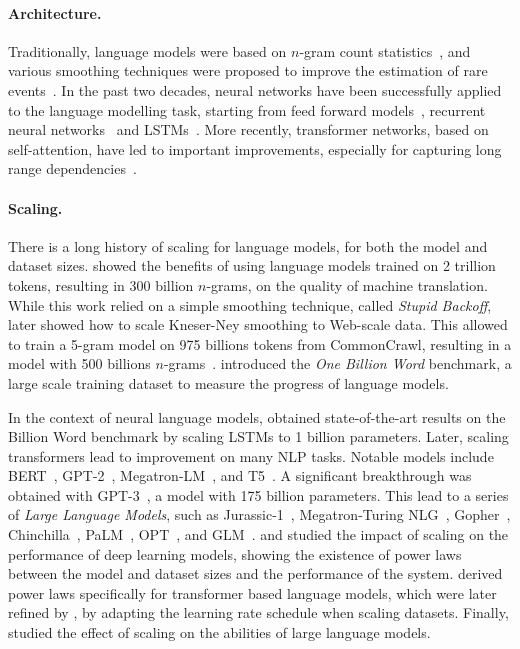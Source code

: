 \paragraph{Architecture.} Traditionally, language models were based on $n$-gram count statistics~\citep{bahl1983maximum}, and various smoothing techniques were proposed to improve the estimation of rare events~\citep{katz1987estimation,kneser1995improved}. In the past two decades, neural networks have been successfully applied to the language modelling task, starting from feed forward models~\citep{bengio2000neural}, recurrent neural networks~\citep{elman1990finding,mikolov2010recurrent} and LSTMs~\citep{hochreiter1997long,graves2013generating}. More recently, transformer networks, based on self-attention, have led to important improvements, especially for capturing long range dependencies~\citep{vaswaniAttention2017,radford2018improving,dai2019transformer}.

\paragraph{Scaling.} There is a long history of scaling for language models, for both the model and dataset sizes.
\citet{brants2007large} showed the benefits of using language models trained on 2 trillion tokens, resulting in 300 billion $n$-grams, on the quality of machine translation. While this work relied on a simple smoothing technique, called \emph{Stupid Backoff}, \citet{heafield2013scalable} later showed how to scale Kneser-Ney smoothing to Web-scale data. This allowed to train a 5-gram model on 975 billions tokens from CommonCrawl, resulting in a model with 500 billions $n$-grams~\citep{buck2014n}.
\citet{chelba2013one} introduced the \emph{One Billion Word} benchmark, a large scale training dataset to measure the progress of language models.

In the context of neural language models, \citet{jozefowicz2016exploring} obtained state-of-the-art results on the Billion Word benchmark by scaling LSTMs to 1 billion parameters. Later, scaling transformers lead to improvement on many NLP tasks. Notable models include BERT~\citep{devlin2018bert}, GPT-2~\citep{radford2019language}, Megatron-LM~\citep{shoeybi2019megatron}, and T5~\citep{raffel2020exploring}. A significant breakthrough was obtained with GPT-3~\citep{brown2020gpt3}, a model with 175 billion parameters. This lead to a series of \emph{Large Language Models}, such as Jurassic-1~\citep{lieber2021jurassic}, Megatron-Turing NLG~\citep{smith2022using}, Gopher~\citep{rae2021goepher}, Chinchilla~\citep{hoffmann2022chinchilla}, PaLM~\citep{chowdhery2022palm}, OPT~\citep{zhang2022opt}, and GLM~\citep{zhengGLM2022}.
\citet{hestness2017deep} and \citet{rosenfeld2019constructive} studied the impact of scaling on the performance of deep learning models, showing the existence of power laws between the model and dataset sizes and the performance of the system.
\citet{kaplan2020scaling} derived power laws specifically for transformer based language models, which were later refined by \citet{hoffmann2022chinchilla}, by adapting the learning rate schedule when scaling datasets. Finally, \citet{wei2022emergent} studied the effect of scaling on the abilities of large language models.

